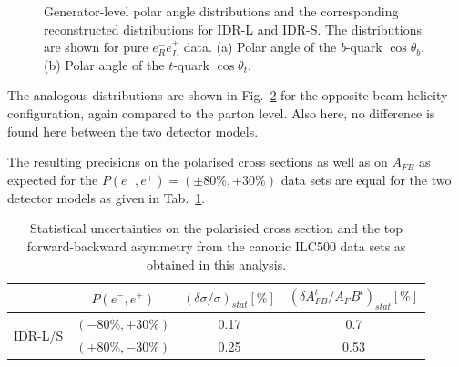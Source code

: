 \begin{figure}[htbp]
\begin{subfigure}{0.475\hsize}
 \caption{  \label{fig:ttbar:costhetatRL}}
 \end{subfigure}
\caption{Generator-level polar angle distributions and the corresponding reconstructed distributions for IDR-L and IDR-S. The distributions are shown for pure $e^-_R e^+_L$ data.
(a) Polar angle of the $b$-quark $\cos{\theta_b}$. 
(b) Polar angle of the $t$-quark $\cos{\theta_t}$.
}
\label{fig:ttbar:resultRL}
\end{figure}

The analogous distributions are shown in Fig.~\ref{fig:ttbar:resultRL} for the opposite beam helicity configuration, again compared to the parton level. Also here, no difference is found here between the two detector models. 

The resulting precisions on the polarised cross sections as well as on $A_{FB}$ as expected for the $P(e^-,e^+)=(\pm 80\%, \mp 30\%)$ data sets are equal for the two detector models as given in Tab.~\ref{tab:AFBtt}.

\begin{table}[htb]
\begin{center}
\begin{tabular}{|c|c|c|c|}
\hline
 & $P(e^-,e^+)$ & $(\delta\sigma / \sigma)_{stat} [\%]$ & $(\delta A_{FB}^t / A_FB^t)_{stat} [\%]$ \\
\hline
\multirow{2}{*}{IDR-L/S} &  $(-80\%,+30\%)$ & 0.17 & 0.7 \\
                         &  $(+80\%,-30\%)$ & 0.25 & 0.53 \\
\hline
\end{tabular}
\end{center}
\caption{Statistical uncertainties on the polarisied cross section and the top forward-backward asymmetry from the canonic ILC500 data sets as obtained in this analysis.}
\label{tab:AFBtt}   
\end{table}    

